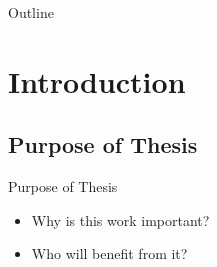 \documentclass[xcolor={table}]{beamer}
\title[Thesis presentation]{\thetitle} %
\author{André Danielsson} %
\institute[KTH] %
{%
\textit{anddani@kth.se}\\ %
\medskip
Royal Institute of Technology\\
Computer Science and Communication\\ %
}
\date{\today} %
\begin{document}




\begin{frame}
\titlepage%
\end{frame}

\begin{frame}{Outline}
\end{frame}

\section{Introduction}
\subsection{Purpose of Thesis}
\begin{frame}{Purpose of Thesis}
    \begin{itemize}
        \item Why is this work important?
        \item Who will benefit from it?
    \end{itemize}
\end{frame}
\end{document}
